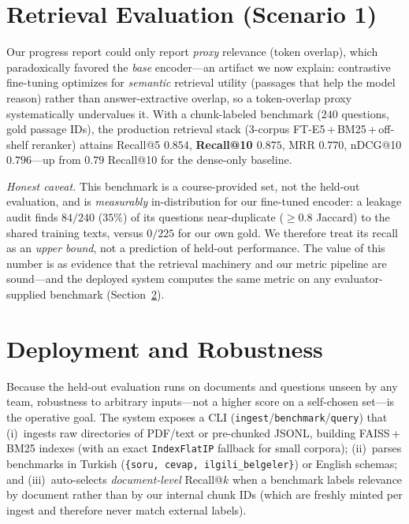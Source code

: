 \documentclass[conference]{IEEEtran}
\newcommand{\best}[1]{\textbf{#1}}
\begin{document}
\section{Retrieval Evaluation (Scenario 1)}
\label{sec:recall}
Our progress report could only report \emph{proxy} relevance (token overlap),
which paradoxically favored the \emph{base} encoder---an artifact we now
explain: contrastive fine-tuning optimizes for \emph{semantic} retrieval
utility (passages that help the model reason) rather than answer-extractive
overlap, so a token-overlap proxy systematically undervalues it. With a
chunk-labeled benchmark ($240$ questions, gold passage IDs), the production
retrieval stack (3-corpus FT-E5\,+\,BM25\,+\,off-shelf reranker) attains
Recall@5 $0.854$, \best{Recall@10 $0.875$}, MRR $0.770$, nDCG@10 $0.796$---up
from $0.79$ Recall@10 for the dense-only baseline.

\noindent\emph{Honest caveat.} This benchmark is a course-provided set, not the
held-out evaluation, and is \emph{measurably} in-distribution for our fine-tuned
encoder: a leakage audit finds $84/240$ ($35\%$) of its questions near-duplicate
($\geq 0.8$ Jaccard) to the shared training texts, versus $0/225$ for our own
gold. We therefore treat its recall as an \emph{upper bound}, not a prediction
of held-out performance. The value of this number is as evidence
that the retrieval machinery and our metric pipeline are sound---and the
deployed system computes the same metric on any evaluator-supplied benchmark
(Section~\ref{sec:deploy}).

\section{Deployment and Robustness}
\label{sec:deploy}
Because the held-out evaluation runs on documents and questions unseen by any
team, robustness to arbitrary inputs---not a higher score on a self-chosen
set---is the operative goal. The system exposes a CLI
(\texttt{ingest}/\texttt{benchmark}/\texttt{query}) that (i)~ingests raw
directories of PDF/text or pre-chunked JSONL, building FAISS\,+\,BM25 indexes
(with an exact \texttt{IndexFlatIP} fallback for small corpora); (ii)~parses
benchmarks in Turkish (\texttt{\{soru, cevap, ilgili\_belgeler\}}) or English
schemas; and (iii)~auto-selects \emph{document-level} Recall@$k$ when a
benchmark labels relevance by document rather than by our internal chunk IDs
(which are freshly minted per ingest and therefore never match external labels).
\end{document}
